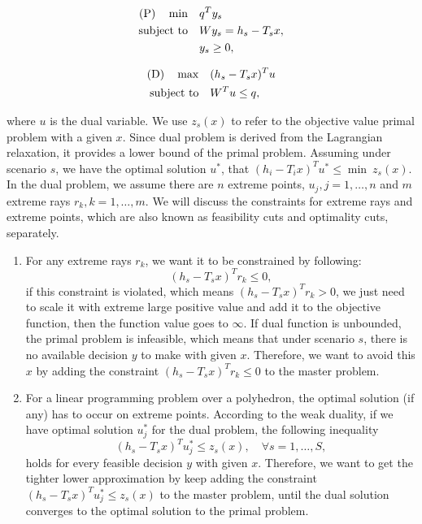 \documentclass[preprint,review,11pt,authoryear]{elsarticle}
\begin{document}
\vspace{-3em}
\begin{multicols}{2}
    \begin{align*}
        \text{(P)} \quad  \min \quad & q^T y_s \\
                    \operatorname{subject~to} \quad & Wy_s = h_s - T_s x, \\
                                     &  y_s \geq 0,
    \end{align*}
    \columnbreak
    
    \begin{align*}
        \text{(D)} \quad \max \quad & (h_s - T_s x)^T u \\
                   \operatorname{subject~to} \quad & W^T u \leq q,
    \end{align*}
\end{multicols}
\vspace{-3em}
where $u$ is the dual variable. We use $z_s(x)$ to refer to the objective value primal problem with a given $x$. Since dual problem is derived from the Lagrangian relaxation, it provides a lower bound of the primal problem. Assuming under scenario $s$, we have the optimal solution $u^*$, that $(h_i - T_i x)^T u^* \leq \min ~z_s(x)$. 
In the dual problem, we assume there are $n$ extreme points, $u_j, j = 1,\dots,n$ and $m$ extreme rays $r_k, k = 1,\dots,m$. We will discuss the constraints for extreme rays and extreme points, which are also known as feasibility cuts and optimality cuts, separately.
\begin{enumerate}
    \item[1.] For any extreme rays $r_k$, we want it to be constrained by following:
        \begin{equation*}
            (h_s - T_s x)^T r_k \leq 0,
        \end{equation*}
        if this constraint is violated, which means $(h_s - T_s x)^T r_k > 0$, we just need to scale it with extreme large positive value and add it to the objective function, then the function value goes to $\infty$. If dual function is unbounded, the primal problem is infeasible, which means that under scenario $s$, there is no available decision $y$ to make with given $x$. Therefore, we want to avoid this $x$ by adding the constraint $(h_s - T_s x)^T r_k \leq 0$ to the master problem.
        
    \item[2.] For a linear programming problem over a polyhedron, the optimal solution (if any) has to occur on extreme points. According to the weak duality, if we have optimal solution $u^*_j$ for the dual problem, the following inequality
        \begin{equation*}
            (h_s - T_s x)^T u^*_j \leq z_s(x), \quad \forall s = 1,\dots,S,
        \end{equation*}
        holds for every feasible decision $y$ with given $x$. Therefore, we want to get the tighter lower approximation by keep adding the constraint $(h_s - T_s x)^T u^*_j \leq z_s(x)$ to the master problem, until the dual solution converges to the optimal solution to the primal problem.
\end{enumerate}
\end{document}
